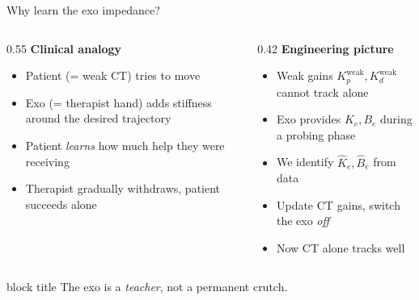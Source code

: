 \documentclass[10pt,aspectratio=169]{beamer}
\newcommand{\Ke}{K_e}
\newcommand{\Be}{B_e}
\newcommand{\Kehat}{\hat{K}_e}
\newcommand{\Behat}{\hat{B}_e}
\newcommand{\Kpw}{K_p^\mathrm{weak}}
\newcommand{\Kdw}{K_d^\mathrm{weak}}
\begin{document}
\begin{frame}{Why learn the exo impedance?}
\begin{columns}[T,onlytextwidth]
\begin{column}{0.55\textwidth}
\textbf{Clinical analogy}
\begin{itemize}
    \item Patient (= weak CT) tries to move
    \item Exo (= therapist hand) adds stiffness around the desired trajectory
    \item Patient \emph{learns} how much help they were receiving
    \item Therapist gradually withdraws, patient succeeds alone
\end{itemize}
\end{column}
\begin{column}{0.42\textwidth}
\textbf{Engineering picture}
\begin{itemize}
    \item Weak gains $\Kpw,\Kdw$ cannot track alone
    \item Exo provides $\Ke,\Be$ during a probing phase
    \item We identify $\Kehat,\Behat$ from data
    \item Update CT gains, switch the exo \emph{off}
    \item Now CT alone tracks well
\end{itemize}
\end{column}
\end{columns}

\vspace{0.3cm}
\begin{center}
\begin{beamercolorbox}[wd=0.9\textwidth,rounded=true,shadow=true]{block title}
\centering The exo is a \emph{teacher}, not a permanent crutch.
\end{beamercolorbox}
\end{center}
\end{frame}
\end{document}
